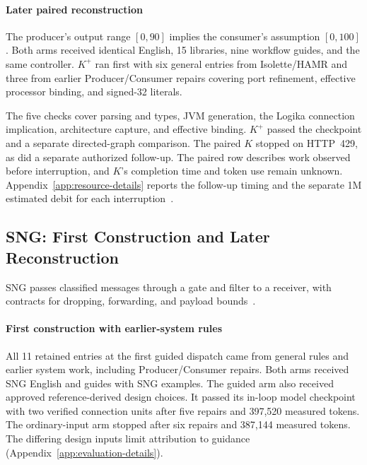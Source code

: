 \paragraph{Later paired reconstruction}
The producer's output range $[0,90]$ implies the consumer's assumption $[0,100]$. Both arms received identical English, 15 libraries, nine workflow guides, and the same controller. $K^{+}$ ran first with six general entries from Isolette/HAMR and three from earlier Producer/\allowbreak{}Consumer repairs covering port refinement, effective processor binding, and signed-32 literals.

The five checks cover parsing and types, JVM generation, the Logika connection implication, architecture capture, and effective binding. $K^{+}$ passed the checkpoint and a separate directed-graph comparison. The paired $K$ stopped on HTTP~429, as did a separate authorized follow-up. The paired row describes work observed before interruption, and $K$'s completion time and token use remain unknown. Appendix~\ref{app:resource-details} reports the follow-up timing and the separate 1M estimated debit for each interruption~\cite{producerConsumerConsolidatedReport2026}.

\subsection{SNG: First Construction and Later Reconstruction}
\label{sec:sng-evaluation}
SNG passes classified messages through a gate and filter to a receiver, with contracts for dropping, forwarding, and payload bounds~\cite{hamrTutorials2026}.

\paragraph{First construction with earlier-system rules}
All 11 retained entries at the first guided dispatch came from general rules and earlier system work, including Producer/\allowbreak{}Consumer repairs. Both arms received SNG English and guides with SNG examples. The guided arm also received approved reference-derived design choices. It passed its in-loop model checkpoint with two verified connection units after five repairs and 397,520 measured tokens. The ordinary-input arm stopped after six repairs and 387,144 measured tokens. The differing design inputs limit attribution to guidance (Appendix~\ref{app:evaluation-details}).

